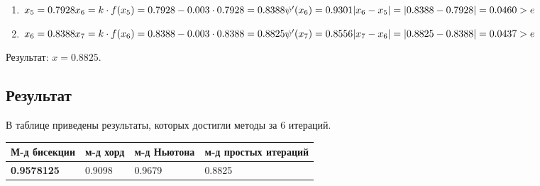 \documentclass{article}
\begin{document}
\begin{enumerate}[label= итерация \arabic{*}:]
\item
\begin{math}
  x_{5} = 0.7928\\
  x_{6} = k \cdot f(x_{5}) = 0.7928-0.003 \cdot 0.7928=0.8388\\
  \psi'(x_{6}) = 0.9301\\
  |x_{6} - x_{5}| = |0.8388-0.7928| = 0.0460 > e 
\end{math}

\item
\begin{math}
  x_{6} = 0.8388\\
  x_{7} = k \cdot f(x_{6}) = 0.8388-0.003 \cdot 0.8388=0.8825\\
  \psi'(x_{7}) = 0.8556\\
  |x_{7} - x_{6}| = |0.8825-0.8388| = 0.0437 > e 
\end{math}

\end{enumerate}
Результат: $x = 0.8825$.

\subsection{Результат}
В таблице приведены результаты, которых достигли методы за 6 итераций.
\begin{center}
  \begin{tabular}{|l|l|l|l|}
  \hline
  \bfseries М-д бисекции & м-д хорд & м-д Ньютона & м-д простых итераций\\
  \hline
  \bfseries 0.9578125 & 0.9098 & 0.9679 & 0.8825 \\
  \hline
  \end{tabular}
\end{center}
\end{document}
